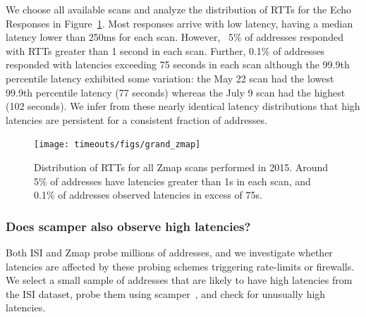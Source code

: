 We choose all
available scans and 
analyze the distribution of
RTTs for the Echo Responses in
Figure~\ref{fig:grand_zmap}. 
%
Most responses arrive with low latency, having a median latency lower than
250ms for each scan.
%
However, ~5\% of addresses responded with RTTs greater than 1 second
in each scan. Further, 0.1\% of addresses responded with latencies exceeding
75 seconds in each scan although the 99.9th percentile
latency exhibited some variation: the May 22 scan had the lowest 99.9th percentile
latency (77 seconds) whereas the July 9 scan had the highest (102 seconds).
%
We infer from these nearly identical latency distributions that high latencies are persistent for a consistent fraction of addresses.



\begin{figure}[tb]
\begin{center}
\texttt{[image: timeouts/figs/grand\_zmap]}
\end{center}
\caption[Distribution of RTTs for all Zmap scans performed in 2015]{\label{fig:grand_zmap}%
Distribution of RTTs for all Zmap scans performed in 2015. Around 5\%
of addresses have latencies greater than 1s in each scan, and 0.1\% of addresses observed latencies in excess of 75s.
}
\end{figure}


\subsubsection*{Does scamper also observe high latencies?}
Both ISI and Zmap probe millions of addresses, and we investigate
whether latencies are affected by these probing schemes
triggering rate-limits or firewalls. We select a small sample of
addresses that are likely to have high latencies from the
ISI dataset, probe them using scamper~\cite{luckie2010scamper}, and check for unusually high latencies.

